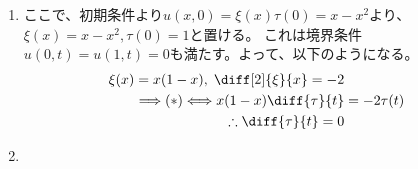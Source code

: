 \begin{enumerate}[(1)]
    \item ここで、初期条件より$u(x, 0) = \xi (x) \tau(0) = x - x^{2}$より、$\xi (x) = x - x^{2}, \tau (0) = 1$と置ける。
        これは境界条件$u(0, t) = u(1, t) = 0$も満たす。よって、以下のようになる。
        \begin{align*}
            \xi(x) = x(1 - x), \; \diff[2]{\xi}{x} = -2\\
            \Longrightarrow
            (*) \Longleftrightarrow
            x(1 - x)\diff{\tau}{t} & = -2\tau (t)\\
            \therefore
            \diff{\tau}{t} = 0
        \end{align*}
    \item 
\end{enumerate}
